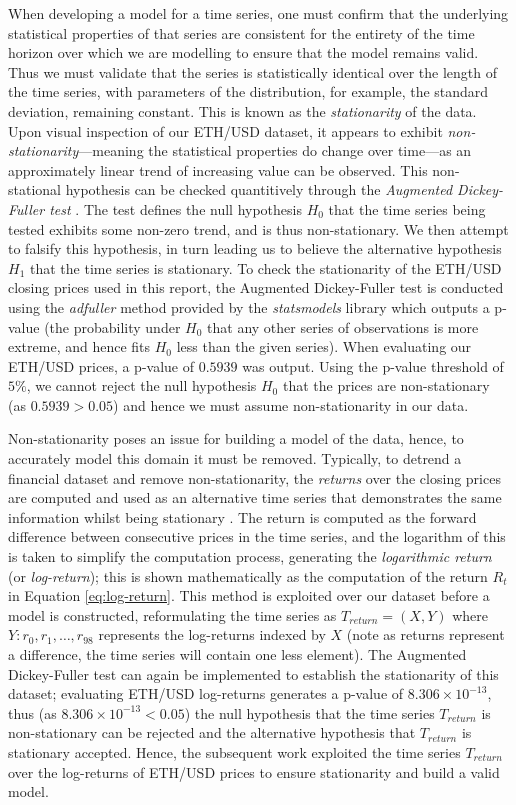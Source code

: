 \documentclass[a4paper, 11pt]{article}
\begin{document}
    When developing a model for a time series, one must confirm that the underlying statistical properties of that series are consistent for the entirety of the time horizon over which we are modelling to ensure that the model remains valid. Thus we must validate that the series is statistically identical over the length of the time series, with parameters of the distribution, for example, the standard deviation, remaining constant. This is known as the \emph{stationarity} of the data. Upon visual inspection of our ETH/USD dataset, it appears to exhibit \emph{non-stationarity}---meaning the statistical properties do change over time---as an approximately linear trend of increasing value can be observed. This non-stational hypothesis can be checked quantitively through the \emph{Augmented Dickey-Fuller test} \cite{mushtaq-2011}. The test defines the null hypothesis $H_0$ that the time series being tested exhibits some non-zero trend, and is thus non-stationary. We then attempt to falsify this hypothesis, in turn leading us to believe the alternative hypothesis $H_1$ that the time series is stationary. To check the stationarity of the ETH/USD closing prices used in this report, the Augmented Dickey-Fuller test is conducted using the \emph{adfuller} method provided by the \emph{statsmodels} library \cite{statsmodels} which outputs a p-value (the probability under $H_0$ that any other series of observations is more extreme, and hence fits $H_0$ less than the given series). When evaluating our ETH/USD prices, a p-value of $0.5939$ was output. Using the p-value threshold of $5\%$, we cannot reject the null hypothesis $H_0$ that the prices are non-stationary (as $0.5939 > 0.05$) and hence we must assume non-stationarity in our data.

    Non-stationarity poses an issue for building a model of the data, hence, to accurately model this domain it must be removed. Typically, to detrend a financial dataset and remove non-stationarity, the \emph{returns} over the closing prices are computed and used as an alternative time series that demonstrates the same information whilst being stationary \cite{liu-2020}. The return is computed as the forward difference between consecutive prices in the time series, and the logarithm of this is taken to simplify the computation process, generating the \emph{logarithmic return} (or \emph{log-return}); this is shown mathematically as the computation of the return $R_t$ in Equation \ref{eq:log-return}. This method is exploited over our dataset before a model is constructed, reformulating the time series as $T_{return} = \left(X, Y \right)$ where $Y \colon r_0, r_1, \ldots, r_{98}$ represents the log-returns indexed by $X$ (note as returns represent a difference, the time series will contain one less element). The Augmented Dickey-Fuller test can again be implemented to establish the stationarity of this dataset; evaluating ETH/USD log-returns generates a p-value of $8.306 \times 10^{-13}$, thus (as $8.306 \times 10^{-13} < 0.05$) the null hypothesis that the time series $T_{return}$ is non-stationary can be rejected and the alternative hypothesis that $T_{return}$ is stationary accepted. Hence, the subsequent work exploited the time series $T_{return}$ over the log-returns of ETH/USD prices to ensure stationarity and build a valid model.
\end{document}
